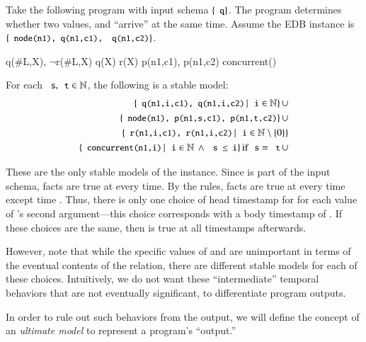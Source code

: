 \begin{example}
\label{ex:unimportant}
Take the following \lang program with input schema $\{\dedalus{q}\}$.  The program determines whether two values,  and  ``arrive'' at the same time.  Assume the EDB instance is $\{\dedalus{node(n1), q(n1,c1),}$ \linebreak $\dedalus{q(n1,c2)}\}$.

\begin{Drules}
        {q(#L,X), $\lnot$r(#L,X)}
        {q(X)}
        {r(X)}
        {p(n1,c1), p(n1,c2)}
        {concurrent()}
\end{Drules}

For each $\dedalus{s}, \dedalus{t} \in \mathbb{N}$, the following is a stable model:
\begin{eqnarray*}
\{\dedalus{q(n1,i,c1), q(n1,i,c2)} \, | \, \dedalus{i} \in \mathbb{N}\} \, \cup \\
\{\dedalus{node(n1), p(n1,s,c1), p(n1,t,c2)}\} \, \cup \\
\{\dedalus{r(n1,i,c1), r(n1,i,c2)} \, | \, \dedalus{i} \in \mathbb{N} \setminus \{0\}\} \\
\{\dedalus{concurrent(n1,i)} \, | \, \dedalus{i} \in \mathbb{N} \, \land \, \dedalus{s $\leq$ i}\} \, \text{if} \, \dedalus{s} = \dedalus{t} \, \cup
\end{eqnarray*}

These are the only stable models of the instance. Since  is part of the input schema,  facts are true at every time.  By the rules,  facts are true at every time except time .  Thus, there is only one choice of head timestamp for  for each value of 's second argument---this choice corresponds with a body timestamp of .  If these choices are the same, then  is true at all timestamps afterwards.

However, note that while the specific values of  and  are unimportant in terms of the eventual contents of the  relation, there are different stable models for each of these choices.  Intuitively, we do not want these ``intermediate'' temporal behaviors that are not eventually significant, to differentiate program outputs.
\end{example}

In order to rule out such behaviors from the output, we will define the concept of an {\em ultimate model} to represent a program's ``output.''

